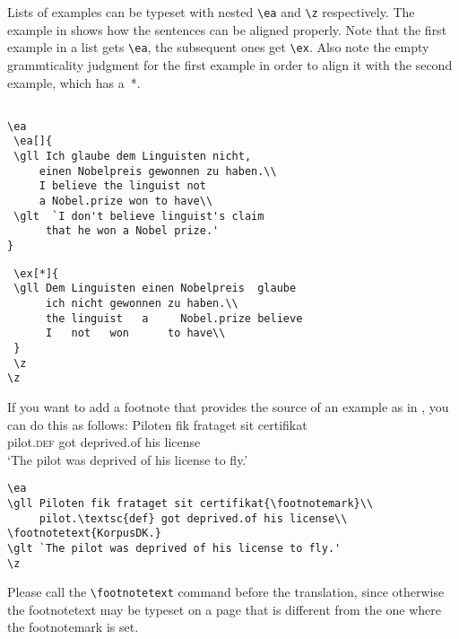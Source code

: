 Lists of examples can be typeset with nested \verb+\ea+  and \verb+\z+  respectively. The example in
 shows how the sentences can be aligned properly. Note that the first example in a list gets \verb+\ea+, the subsequent ones get \verb+\ex+. Also note the empty grammticality judgment for the first example in order to align it with the second example, which has a~*.


\ea  \label{ex:showcases:list}
\z
\z  

\begin{verbatim}

\ea 
 \ea[]{
 \gll Ich glaube dem Linguisten nicht, 
     einen Nobelpreis gewonnen zu haben.\\
     I believe the linguist not 
     a Nobel.prize won to have\\
 \glt  `I don't believe linguist's claim 
      that he won a Nobel prize.'
}
\end{verbatim}
\newpage
\begin{verbatim}
 \ex[*]{
 \gll Dem Linguisten einen Nobelpreis  glaube  
      ich nicht gewonnen zu haben.\\
      the linguist   a     Nobel.prize believe 
      I   not   won      to have\\
 }
 \z
\z
\end{verbatim}

If you want to add a footnote that provides the source of an example as in , you can do
this as follows:
\ea\label{ex:showcases:footnote}
\gll Piloten         fik frataget    sit certifikat\footnotemark\\
     pilot.\textsc{def} got deprived.of his license\\
\glt `The pilot was deprived of his license to fly.'
\z 
\begin{verbatim}
\ea
\gll Piloten fik frataget sit certifikat{\footnotemark}\\
     pilot.\textsc{def} got deprived.of his license\\
\footnotetext{KorpusDK.}
\glt `The pilot was deprived of his license to fly.'
\z 
\end{verbatim}
Please call the \verb+\footnotetext+ command before the translation, since otherwise the
footnotetext may be typeset on a page that is different from the one where the footnotemark is set.

